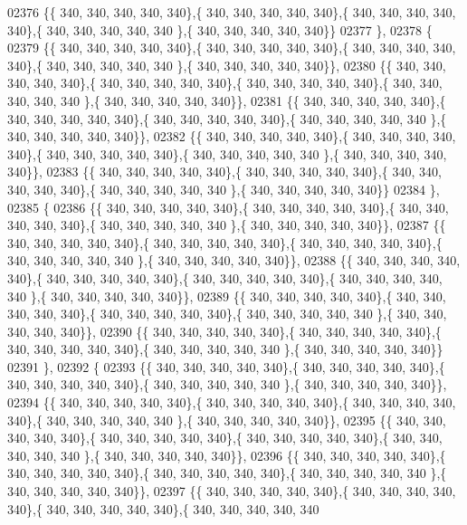 \begin{DoxyCode}
02376 \{\{ 340, 340, 340, 340, 340\},\{ 340, 340, 340, 340, 340\},\{ 340, 340, 340, 340, 340\},\{ 340, 340, 340, 340, 340
      \},\{ 340, 340, 340, 340, 340\}\}
02377 \},
02378 \{
02379 \{\{ 340, 340, 340, 340, 340\},\{ 340, 340, 340, 340, 340\},\{ 340, 340, 340, 340, 340\},\{ 340, 340, 340, 340, 340
      \},\{ 340, 340, 340, 340, 340\}\},
02380 \{\{ 340, 340, 340, 340, 340\},\{ 340, 340, 340, 340, 340\},\{ 340, 340, 340, 340, 340\},\{ 340, 340, 340, 340, 340
      \},\{ 340, 340, 340, 340, 340\}\},
02381 \{\{ 340, 340, 340, 340, 340\},\{ 340, 340, 340, 340, 340\},\{ 340, 340, 340, 340, 340\},\{ 340, 340, 340, 340, 340
      \},\{ 340, 340, 340, 340, 340\}\},
02382 \{\{ 340, 340, 340, 340, 340\},\{ 340, 340, 340, 340, 340\},\{ 340, 340, 340, 340, 340\},\{ 340, 340, 340, 340, 340
      \},\{ 340, 340, 340, 340, 340\}\},
02383 \{\{ 340, 340, 340, 340, 340\},\{ 340, 340, 340, 340, 340\},\{ 340, 340, 340, 340, 340\},\{ 340, 340, 340, 340, 340
      \},\{ 340, 340, 340, 340, 340\}\}
02384 \},
02385 \{
02386 \{\{ 340, 340, 340, 340, 340\},\{ 340, 340, 340, 340, 340\},\{ 340, 340, 340, 340, 340\},\{ 340, 340, 340, 340, 340
      \},\{ 340, 340, 340, 340, 340\}\},
02387 \{\{ 340, 340, 340, 340, 340\},\{ 340, 340, 340, 340, 340\},\{ 340, 340, 340, 340, 340\},\{ 340, 340, 340, 340, 340
      \},\{ 340, 340, 340, 340, 340\}\},
02388 \{\{ 340, 340, 340, 340, 340\},\{ 340, 340, 340, 340, 340\},\{ 340, 340, 340, 340, 340\},\{ 340, 340, 340, 340, 340
      \},\{ 340, 340, 340, 340, 340\}\},
02389 \{\{ 340, 340, 340, 340, 340\},\{ 340, 340, 340, 340, 340\},\{ 340, 340, 340, 340, 340\},\{ 340, 340, 340, 340, 340
      \},\{ 340, 340, 340, 340, 340\}\},
02390 \{\{ 340, 340, 340, 340, 340\},\{ 340, 340, 340, 340, 340\},\{ 340, 340, 340, 340, 340\},\{ 340, 340, 340, 340, 340
      \},\{ 340, 340, 340, 340, 340\}\}
02391 \},
02392 \{
02393 \{\{ 340, 340, 340, 340, 340\},\{ 340, 340, 340, 340, 340\},\{ 340, 340, 340, 340, 340\},\{ 340, 340, 340, 340, 340
      \},\{ 340, 340, 340, 340, 340\}\},
02394 \{\{ 340, 340, 340, 340, 340\},\{ 340, 340, 340, 340, 340\},\{ 340, 340, 340, 340, 340\},\{ 340, 340, 340, 340, 340
      \},\{ 340, 340, 340, 340, 340\}\},
02395 \{\{ 340, 340, 340, 340, 340\},\{ 340, 340, 340, 340, 340\},\{ 340, 340, 340, 340, 340\},\{ 340, 340, 340, 340, 340
      \},\{ 340, 340, 340, 340, 340\}\},
02396 \{\{ 340, 340, 340, 340, 340\},\{ 340, 340, 340, 340, 340\},\{ 340, 340, 340, 340, 340\},\{ 340, 340, 340, 340, 340
      \},\{ 340, 340, 340, 340, 340\}\},
02397 \{\{ 340, 340, 340, 340, 340\},\{ 340, 340, 340, 340, 340\},\{ 340, 340, 340, 340, 340\},\{ 340, 340, 340, 340, 340

\end{DoxyCode}
